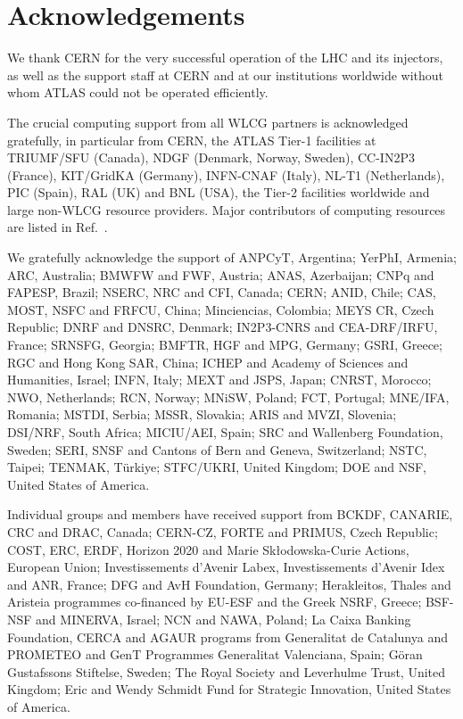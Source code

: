 \documentclass[PAPER, cernpreprint=true, atlasdraft=false, UKenglish, texmf, orcidlogo]{atlasdoc}
\begin{document}
\FloatBarrier





\section*{Acknowledgements}











We thank CERN for the very successful operation of the LHC and its injectors, as well as the support staff at
CERN and at our institutions worldwide without whom ATLAS could not be operated efficiently.

The crucial computing support from all WLCG partners is acknowledged gratefully, in particular from CERN, the ATLAS Tier-1 facilities at TRIUMF/SFU (Canada), NDGF (Denmark, Norway, Sweden), CC-IN2P3 (France), KIT/GridKA (Germany), INFN-CNAF (Italy), NL-T1 (Netherlands), PIC (Spain), RAL (UK) and BNL (USA), the Tier-2 facilities worldwide and large non-WLCG resource providers. Major contributors of computing resources are listed in Ref.~\cite{ATL-SOFT-PUB-2026-001}.

We gratefully acknowledge the support of ANPCyT, Argentina; YerPhI, Armenia; ARC, Australia; BMWFW and FWF, Austria; ANAS, Azerbaijan; CNPq and FAPESP, Brazil; NSERC, NRC and CFI, Canada; CERN; ANID, Chile; CAS, MOST, NSFC and FRFCU, China; Minciencias, Colombia; MEYS CR, Czech Republic; DNRF and DNSRC, Denmark; IN2P3-CNRS and CEA-DRF/IRFU, France; SRNSFG, Georgia; BMFTR, HGF and MPG, Germany; GSRI, Greece; RGC and Hong Kong SAR, China; ICHEP and Academy of Sciences and Humanities, Israel; INFN, Italy; MEXT and JSPS, Japan; CNRST, Morocco; NWO, Netherlands; RCN, Norway; MNiSW, Poland; FCT, Portugal; MNE/IFA, Romania; MSTDI, Serbia; MSSR, Slovakia; ARIS and MVZI, Slovenia; DSI/NRF, South Africa; MICIU/AEI, Spain; SRC and Wallenberg Foundation, Sweden; SERI, SNSF and Cantons of Bern and Geneva, Switzerland; NSTC, Taipei; TENMAK, T\"urkiye; STFC/UKRI, United Kingdom; DOE and NSF, United States of America.

Individual groups and members have received support from BCKDF, CANARIE, CRC and DRAC, Canada; CERN-CZ, FORTE and PRIMUS, Czech Republic; COST, ERC, ERDF, Horizon 2020 and Marie Sk{\l}odowska-Curie Actions, European Union; Investissements d'Avenir Labex, Investissements d'Avenir Idex and ANR, France; DFG and AvH Foundation, Germany; Herakleitos, Thales and Aristeia programmes co-financed by EU-ESF and the Greek NSRF, Greece; BSF-NSF and MINERVA, Israel; NCN and NAWA, Poland; La Caixa Banking Foundation, CERCA and AGAUR programs from Generalitat de Catalunya and PROMETEO and GenT Programmes Generalitat Valenciana, Spain; G\"{o}ran Gustafssons Stiftelse, Sweden; The Royal Society and Leverhulme Trust, United Kingdom; Eric and Wendy Schmidt Fund for Strategic Innovation, United States of America.
\end{document}
